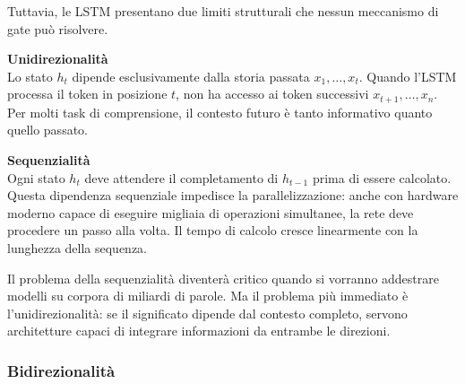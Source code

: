 Tuttavia, le LSTM presentano due limiti strutturali che nessun meccanismo di gate può risolvere.
\begin{notebox}
\textbf{Unidirezionalità}\\
Lo stato $h_t$ dipende esclusivamente dalla storia passata $x_1, \dots, x_t$. Quando l'LSTM processa il token in posizione $t$, non ha accesso ai token successivi $x_{t+1}, \dots, x_n$. Per molti task di comprensione, il contesto futuro è tanto informativo quanto quello passato.
\end{notebox}

\begin{notebox}
\textbf{Sequenzialità}\\
Ogni stato $h_t$ deve attendere il completamento di $h_{t-1}$ prima di essere calcolato. Questa dipendenza sequenziale impedisce la parallelizzazione: anche con hardware moderno capace di eseguire migliaia di operazioni simultanee, la rete deve procedere un passo alla volta. Il tempo di calcolo cresce linearmente con la lunghezza della sequenza.
\end{notebox}
Il problema della sequenzialità diventerà critico quando si vorranno addestrare modelli su corpora di miliardi di parole. Ma il problema più immediato è l'unidirezionalità: se il significato dipende dal contesto completo, servono architetture capaci di integrare informazioni da entrambe le direzioni.















\subsubsection{Bidirezionalità}
\label{subsubsec:bidirectional}

